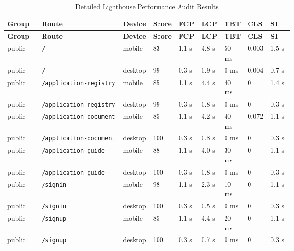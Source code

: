 \begin{landscape}
\small
\setlength{\tabcolsep}{4pt}
\renewcommand{\arraystretch}{1.1}

\begin{xltabular}{\linewidth}{p{0.12\linewidth} X p{0.09\linewidth} p{0.07\linewidth} p{0.08\linewidth} p{0.08\linewidth} p{0.08\linewidth} p{0.08\linewidth} p{0.08\linewidth}}
\caption{Detailed Lighthouse Performance Audit Results}
\label{tab:detailed-performance-audit-results}\\
\hline
\textbf{Group} & \textbf{Route} & \textbf{Device} & \textbf{Score} & \textbf{FCP} & \textbf{LCP} & \textbf{TBT} & \textbf{CLS} & \textbf{SI} \\
\hline
\endfirsthead

\hline
\textbf{Group} & \textbf{Route} & \textbf{Device} & \textbf{Score} & \textbf{FCP} & \textbf{LCP} & \textbf{TBT} & \textbf{CLS} & \textbf{SI} \\
\hline
\endhead

\hline
\endfoot

public & \texttt{/} & mobile & 83 & 1.1 s & 4.8 s & 50 ms & 0.003 & 1.5 s \\
public & \texttt{/} & desktop & 99 & 0.3 s & 0.9 s & 0 ms & 0.004 & 0.7 s \\

public & \texttt{/application-registry} & mobile & 85 & 1.1 s & 4.4 s & 40 ms & 0 & 1.4 s \\
public & \texttt{/application-registry} & desktop & 99 & 0.3 s & 0.8 s & 0 ms & 0 & 0.3 s \\

public & \texttt{/application-document} & mobile & 85 & 1.1 s & 4.2 s & 40 ms & 0.072 & 1.1 s \\
public & \texttt{/application-document} & desktop & 100 & 0.3 s & 0.8 s & 0 ms & 0 & 0.3 s \\

public & \texttt{/application-guide} & mobile & 88 & 1.1 s & 4.0 s & 30 ms & 0 & 1.1 s \\
public & \texttt{/application-guide} & desktop & 100 & 0.3 s & 0.8 s & 0 ms & 0 & 0.3 s \\

public & \texttt{/signin} & mobile & 98 & 1.1 s & 2.3 s & 10 ms & 0 & 1.1 s \\
public & \texttt{/signin} & desktop & 100 & 0.3 s & 0.5 s & 0 ms & 0 & 0.3 s \\

public & \texttt{/signup} & mobile & 85 & 1.1 s & 4.4 s & 20 ms & 0 & 1.1 s \\
public & \texttt{/signup} & desktop & 100 & 0.3 s & 0.7 s & 0 ms & 0 & 0.3 s \\


\end{xltabular}
\end{landscape}
